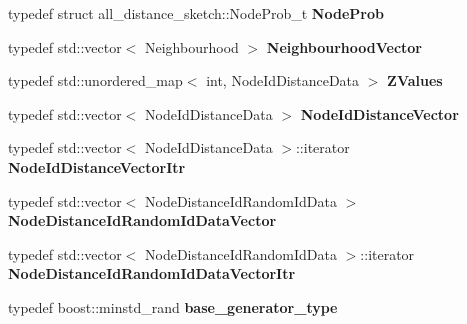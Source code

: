 \begin{DoxyCompactItemize}
\item 
\hypertarget{namespaceall__distance__sketch_afe1012f59c9acefad48d9c8b254f62da}{}typedef struct all\+\_\+distance\+\_\+sketch\+::\+Node\+Prob\+\_\+t {\bfseries Node\+Prob}\label{namespaceall__distance__sketch_afe1012f59c9acefad48d9c8b254f62da}

\item 
\hypertarget{namespaceall__distance__sketch_a1b6c1bccb4c2618347ee06c820a5ab9d}{}typedef std\+::vector$<$ Neighbourhood $>$ {\bfseries Neighbourhood\+Vector}\label{namespaceall__distance__sketch_a1b6c1bccb4c2618347ee06c820a5ab9d}

\item 
\hypertarget{namespaceall__distance__sketch_a60854de6ec0a7d77c5e111cce0c2f1fd}{}typedef std\+::unordered\+\_\+map$<$ int, Node\+Id\+Distance\+Data $>$ {\bfseries Z\+Values}\label{namespaceall__distance__sketch_a60854de6ec0a7d77c5e111cce0c2f1fd}

\item 
\hypertarget{namespaceall__distance__sketch_a21b129900de9d9cfbb3406f7e0d1a75a}{}typedef std\+::vector$<$ Node\+Id\+Distance\+Data $>$ {\bfseries Node\+Id\+Distance\+Vector}\label{namespaceall__distance__sketch_a21b129900de9d9cfbb3406f7e0d1a75a}

\item 
\hypertarget{namespaceall__distance__sketch_aeb3aa8f88e2ff80d4625d227ad385dae}{}typedef std\+::vector$<$ Node\+Id\+Distance\+Data $>$\+::iterator {\bfseries Node\+Id\+Distance\+Vector\+Itr}\label{namespaceall__distance__sketch_aeb3aa8f88e2ff80d4625d227ad385dae}

\item 
\hypertarget{namespaceall__distance__sketch_aba91dd69245d43d635e9aa605e31d85e}{}typedef std\+::vector$<$ Node\+Distance\+Id\+Random\+Id\+Data $>$ {\bfseries Node\+Distance\+Id\+Random\+Id\+Data\+Vector}\label{namespaceall__distance__sketch_aba91dd69245d43d635e9aa605e31d85e}

\item 
\hypertarget{namespaceall__distance__sketch_ab3b8677a1a08a8cd393e4dc0cc0f90e2}{}typedef std\+::vector$<$ Node\+Distance\+Id\+Random\+Id\+Data $>$\+::iterator {\bfseries Node\+Distance\+Id\+Random\+Id\+Data\+Vector\+Itr}\label{namespaceall__distance__sketch_ab3b8677a1a08a8cd393e4dc0cc0f90e2}

\item 
\hypertarget{namespaceall__distance__sketch_afd0190bdb1b259b86910f87a565d592d}{}typedef boost\+::minstd\+\_\+rand {\bfseries base\+\_\+generator\+\_\+type}\label{namespaceall__distance__sketch_afd0190bdb1b259b86910f87a565d592d}

\end{DoxyCompactItemize}
